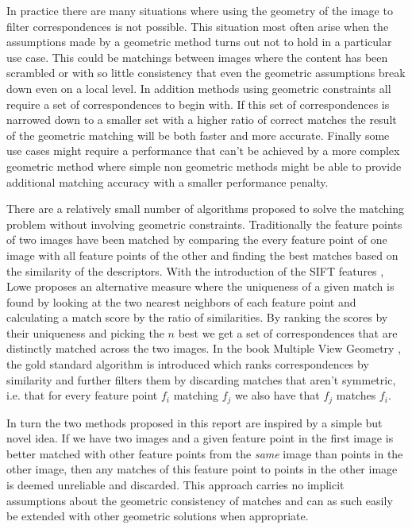 \documentclass{article}
\begin{document}
In practice there are many situations where using the geometry of the 
image to filter correspondences is not possible. This situation most 
often arise when the assumptions made by a geometric method turns out 
not to hold in a particular use case. This could be matchings between 
images where the content has been scrambled or with so little 
consistency that even the geometric assumptions break down even on a 
local level. In addition methods using geometric constraints all require 
a set of correspondences to begin with. If this set of correspondences 
is narrowed down to a smaller set with a higher ratio of correct matches 
the result of the geometric matching will be both faster and more 
accurate.  Finally some use cases might require a performance that can't 
be achieved by a more complex geometric method where simple non 
geometric methods might be able to provide additional matching accuracy 
with a smaller performance penalty.

There are a relatively small number of algorithms proposed to solve the 
matching problem without involving geometric constraints. Traditionally 
the feature points of two images have been matched by comparing the 
every feature point of one image with all feature points of the other 
and finding the best matches based on the similarity of the descriptors.  
With the introduction of the SIFT features \cite{lowe2004sift}, Lowe 
proposes an alternative measure where the uniqueness of a given match is 
found by looking at the two nearest neighbors of each feature point and 
calculating a match score by the ratio of similarities. By ranking the 
scores by their uniqueness and picking the $n$ best we get a set of 
correspondences that are distinctly matched across the two images. In 
the book Multiple View Geometry \cite[p.  114]{multipleView}, the gold 
standard algorithm is introduced which ranks correspondences by 
similarity and further filters them by discarding matches that aren't 
symmetric, i.e. that for every feature point $f_i$ matching $f_j$ we 
also have that $f_j$ matches $f_i$.

In turn the two methods proposed in this report are inspired by a simple 
but novel idea. If we have two images and a given feature point in the 
first image is better matched with other feature points from the 
\emph{same} image than points in the other image, then any matches of 
this feature point to points in the other image is deemed unreliable and 
discarded.  This approach carries no implicit assumptions about the 
geometric consistency of matches and can as such easily be extended with 
other geometric solutions when appropriate.
\end{document}
